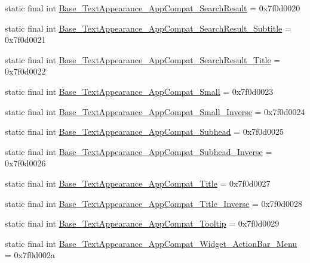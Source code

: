 \begin{DoxyCompactItemize}
static final int \mbox{\hyperlink{classcom_1_1synnapps_1_1carouselview_1_1_r_1_1style_a90d8af8bd8707f80f074535a04ced934}{Base\+\_\+\+Text\+Appearance\+\_\+\+App\+Compat\+\_\+\+Search\+Result}} = 0x7f0d0020
\item 
static final int \mbox{\hyperlink{classcom_1_1synnapps_1_1carouselview_1_1_r_1_1style_a9e41487f73c6e47008bd59a9ee268ceb}{Base\+\_\+\+Text\+Appearance\+\_\+\+App\+Compat\+\_\+\+Search\+Result\+\_\+\+Subtitle}} = 0x7f0d0021
\item 
static final int \mbox{\hyperlink{classcom_1_1synnapps_1_1carouselview_1_1_r_1_1style_a9c97834951e9ce390b46fba8b69d9a88}{Base\+\_\+\+Text\+Appearance\+\_\+\+App\+Compat\+\_\+\+Search\+Result\+\_\+\+Title}} = 0x7f0d0022
\item 
static final int \mbox{\hyperlink{classcom_1_1synnapps_1_1carouselview_1_1_r_1_1style_a5e3b4386666ace3710cfad34f3812e00}{Base\+\_\+\+Text\+Appearance\+\_\+\+App\+Compat\+\_\+\+Small}} = 0x7f0d0023
\item 
static final int \mbox{\hyperlink{classcom_1_1synnapps_1_1carouselview_1_1_r_1_1style_ac88819ebd35d0242255b6423e5ea9c97}{Base\+\_\+\+Text\+Appearance\+\_\+\+App\+Compat\+\_\+\+Small\+\_\+\+Inverse}} = 0x7f0d0024
\item 
static final int \mbox{\hyperlink{classcom_1_1synnapps_1_1carouselview_1_1_r_1_1style_acb4b650082cfb9aab5e8fa0e57272b1e}{Base\+\_\+\+Text\+Appearance\+\_\+\+App\+Compat\+\_\+\+Subhead}} = 0x7f0d0025
\item 
static final int \mbox{\hyperlink{classcom_1_1synnapps_1_1carouselview_1_1_r_1_1style_ab97e50d2a1eab8a90e8a6e876e6311b9}{Base\+\_\+\+Text\+Appearance\+\_\+\+App\+Compat\+\_\+\+Subhead\+\_\+\+Inverse}} = 0x7f0d0026
\item 
static final int \mbox{\hyperlink{classcom_1_1synnapps_1_1carouselview_1_1_r_1_1style_adba40844f3ab19c4aa6b7ee51315a9ff}{Base\+\_\+\+Text\+Appearance\+\_\+\+App\+Compat\+\_\+\+Title}} = 0x7f0d0027
\item 
static final int \mbox{\hyperlink{classcom_1_1synnapps_1_1carouselview_1_1_r_1_1style_a99ee60edc6b830ff24eee21034001ddc}{Base\+\_\+\+Text\+Appearance\+\_\+\+App\+Compat\+\_\+\+Title\+\_\+\+Inverse}} = 0x7f0d0028
\item 
static final int \mbox{\hyperlink{classcom_1_1synnapps_1_1carouselview_1_1_r_1_1style_a88bb2b0dd15513ed9dc02f3be51ad568}{Base\+\_\+\+Text\+Appearance\+\_\+\+App\+Compat\+\_\+\+Tooltip}} = 0x7f0d0029
\item 
static final int \mbox{\hyperlink{classcom_1_1synnapps_1_1carouselview_1_1_r_1_1style_ac62f63103f1329115a6662794f221683}{Base\+\_\+\+Text\+Appearance\+\_\+\+App\+Compat\+\_\+\+Widget\+\_\+\+Action\+Bar\+\_\+\+Menu}} = 0x7f0d002a

\end{DoxyCompactItemize}
